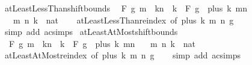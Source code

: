 \begin{isabellebody}
%
\endisatagproof
{\isafoldproof}%
%
\isadelimproof
\isanewline
%
\endisadelimproof
\isanewline
{}\isamarkupfalse%
\ atLeastLessThan{\isacharunderscore}{\kern0pt}shift{\isacharunderscore}{\kern0pt}bounds{\isacharcolon}{\kern0pt}\isanewline
\ \ {\isachardoublequoteopen}F\ g\ {\isacharbraceleft}{\kern0pt}m\ {\isacharplus}{\kern0pt}\ k{\isachardot}{\kern0pt}{\isachardot}{\kern0pt}{\isacharless}{\kern0pt}n\ {\isacharplus}{\kern0pt}\ k{\isacharbraceright}{\kern0pt}\ {\isacharequal}{\kern0pt}\ F\ {\isacharparenleft}{\kern0pt}g\ {\isasymcirc}\ plus\ k{\isacharparenright}{\kern0pt}\ {\isacharbraceleft}{\kern0pt}m{\isachardot}{\kern0pt}{\isachardot}{\kern0pt}{\isacharless}{\kern0pt}n{\isacharbraceright}{\kern0pt}{\isachardoublequoteclose}\isanewline
\ \ \ m\ n\ k\ {\isacharcolon}{\kern0pt}{\isacharcolon}{\kern0pt}\ nat\isanewline
%
\isadelimproof
\ \ %
\endisadelimproof
%
\isatagproof
{}\isamarkupfalse%
\ atLeastLessThan{\isacharunderscore}{\kern0pt}reindex\ {\isacharbrackleft}{\kern0pt}of\ {\isachardoublequoteopen}plus\ k{\isachardoublequoteclose}\ m\ n\ g{\isacharbrackright}{\kern0pt}\isanewline
\ \ \isamarkupfalse%
\ {\isacharparenleft}{\kern0pt}simp\ add{\isacharcolon}{\kern0pt}\ ac{\isacharunderscore}{\kern0pt}simps{\isacharparenright}{\kern0pt}%
\endisatagproof
{\isafoldproof}%
%
\isadelimproof
\isanewline
%
\endisadelimproof
\isanewline
{}\isamarkupfalse%
\ atLeastAtMost{\isacharunderscore}{\kern0pt}shift{\isacharunderscore}{\kern0pt}bounds{\isacharcolon}{\kern0pt}\isanewline
\ \ {\isachardoublequoteopen}F\ g\ {\isacharbraceleft}{\kern0pt}m\ {\isacharplus}{\kern0pt}\ k{\isachardot}{\kern0pt}{\isachardot}{\kern0pt}n\ {\isacharplus}{\kern0pt}\ k{\isacharbraceright}{\kern0pt}\ {\isacharequal}{\kern0pt}\ F\ {\isacharparenleft}{\kern0pt}g\ {\isasymcirc}\ plus\ k{\isacharparenright}{\kern0pt}\ {\isacharbraceleft}{\kern0pt}m{\isachardot}{\kern0pt}{\isachardot}{\kern0pt}n{\isacharbraceright}{\kern0pt}{\isachardoublequoteclose}\isanewline
\ \ \ m\ n\ k\ {\isacharcolon}{\kern0pt}{\isacharcolon}{\kern0pt}\ nat\isanewline
%
\isadelimproof
\ \ %
\endisadelimproof
%
\isatagproof
{}\isamarkupfalse%
\ atLeastAtMost{\isacharunderscore}{\kern0pt}reindex\ {\isacharbrackleft}{\kern0pt}of\ {\isachardoublequoteopen}plus\ k{\isachardoublequoteclose}\ m\ n\ g{\isacharbrackright}{\kern0pt}\isanewline
\ \ \isamarkupfalse%
\ {\isacharparenleft}{\kern0pt}simp\ add{\isacharcolon}{\kern0pt}\ ac{\isacharunderscore}{\kern0pt}simps{\isacharparenright}{\kern0pt}%
\endisatagproof

\end{isabellebody}
